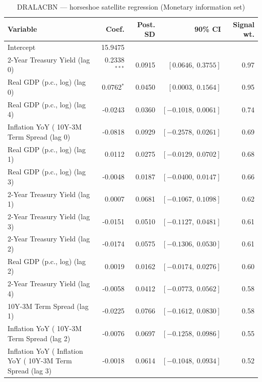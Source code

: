 \begin{table}[!htbp]
\centering
\caption{DRALACBN --- horseshoe satellite regression (Monetary information set)}
\label{tab:dralacbn_monetary_horseshoe}
\begin{tabular}{lrrrr}
\toprule
Variable & Coef. & Post. SD & 90\% CI & Signal wt. \\
\midrule
Intercept & 15.9475 & & & \\
2-Year Treasury Yield (lag 0) & 0.2338$^{***}$ & 0.0915 & $[0.0646,\ 0.3755]$ & 0.97 \\
Real GDP (p.c., log) (lag 0) & 0.0762$^{*}$ & 0.0450 & $[0.0003,\ 0.1564]$ & 0.95 \\
Real GDP (p.c., log) (lag 4) & -0.0243 & 0.0360 & $[-0.1018,\ 0.0061]$ & 0.74 \\
Inflation YoY (%
10Y-3M Term Spread (lag 0) & -0.0818 & 0.0929 & $[-0.2578,\ 0.0261]$ & 0.69 \\
Real GDP (p.c., log) (lag 1) & 0.0112 & 0.0275 & $[-0.0129,\ 0.0702]$ & 0.68 \\
Real GDP (p.c., log) (lag 3) & -0.0048 & 0.0187 & $[-0.0400,\ 0.0147]$ & 0.66 \\
2-Year Treasury Yield (lag 1) & 0.0007 & 0.0681 & $[-0.1067,\ 0.1098]$ & 0.62 \\
2-Year Treasury Yield (lag 3) & -0.0151 & 0.0510 & $[-0.1127,\ 0.0481]$ & 0.61 \\
2-Year Treasury Yield (lag 2) & -0.0174 & 0.0575 & $[-0.1306,\ 0.0530]$ & 0.61 \\
Real GDP (p.c., log) (lag 2) & 0.0019 & 0.0162 & $[-0.0174,\ 0.0276]$ & 0.60 \\
2-Year Treasury Yield (lag 4) & -0.0058 & 0.0412 & $[-0.0773,\ 0.0562]$ & 0.58 \\
10Y-3M Term Spread (lag 1) & -0.0225 & 0.0766 & $[-0.1612,\ 0.0830]$ & 0.58 \\
Inflation YoY (%
10Y-3M Term Spread (lag 2) & -0.0076 & 0.0697 & $[-0.1258,\ 0.0986]$ & 0.55 \\
Inflation YoY (%
Inflation YoY (%
10Y-3M Term Spread (lag 3) & -0.0018 & 0.0614 & $[-0.1048,\ 0.0934]$ & 0.52 \\

\end{tabular}
\end{table}
